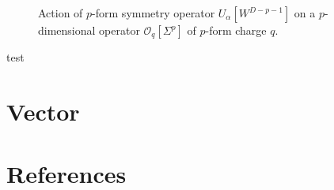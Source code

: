 \documentclass[
  letterpaper,
  DIV=11,
  numbers=noendperiod]{scrreport}
\begin{document}
\begin{figure}

\begin{minipage}[t]{0.50\linewidth}

{\centering 


}

\end{minipage}%
%
\begin{minipage}[t]{0.50\linewidth}

{\centering 


}

\end{minipage}%

\caption{\label{fig-elephants}Action of \(p\)-form symmetry operator
\(U_\alpha[W^{D-p-1}]\) on a \(p\)-dimensional operator
\(\mathcal{O}_q[\Sigma^p]\) of \(p\)-form charge \(q\).}

\end{figure}

test


\hypertarget{sec-vector}{%
\chapter{Vector}\label{sec-vector}}


\hypertarget{references}{%
\chapter*{References}\label{references}}


\printbibliography[heading=none]
\end{document}
